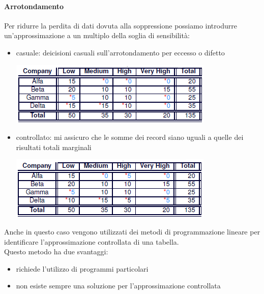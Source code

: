 \paragraph{Arrotondamento}
Per ridurre la perdita di dati dovuta alla soppressione possiamo introdurre un'approssimazione a un multiplo della soglia di sensibilità:
\begin{itemize}
    \item casuale: deicisioni casuali sull'arrotondamento per eccesso o difetto
    \begin{center}
        \includegraphics[scale=0.6]{img/randomround.png}
    \end{center}
    \item controllato: mi assicuro che le somme dei record siano uguali a quelle dei risultati totali marginali
    \begin{center}
        \includegraphics[scale=0.6]{img/contround.png}
    \end{center}
\end{itemize}
Anche in questo caso vengono utilizzati dei metodi di programmazione lineare per identificare l'approssimazione controllata di una tabella.\\
Questo metodo ha due svantaggi:
\begin{itemize}
    \item richiede l'utilizzo di programmi particolari
    \item non esiste sempre una soluzione per l'approssimazione controllata
\end{itemize}

